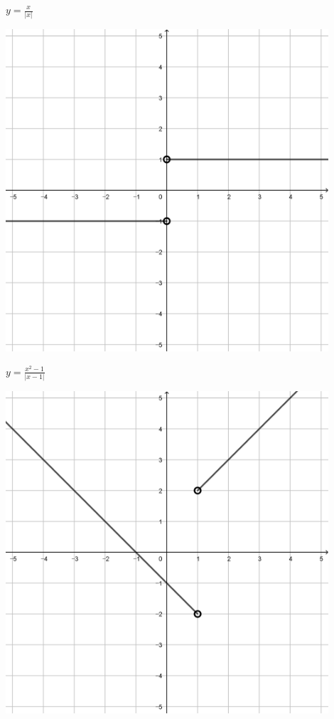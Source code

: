 \documentclass[a4paper]{oblivoir}
\begin{document}
\begin{minipage}{0.45\textwidth}\centering
\(y=\frac{x}{|x|}\)
\par\bigskip\includegraphics[width=0.9\textwidth]{img/17-3}
\end{minipage}
\begin{minipage}{0.45\textwidth}\centering
\(y=\frac{x^2-1}{|x-1|}\)
\par\bigskip\includegraphics[width=0.9\textwidth]{img/17-4}
\end{minipage}\bigskip\bigskip\par
\end{document}
